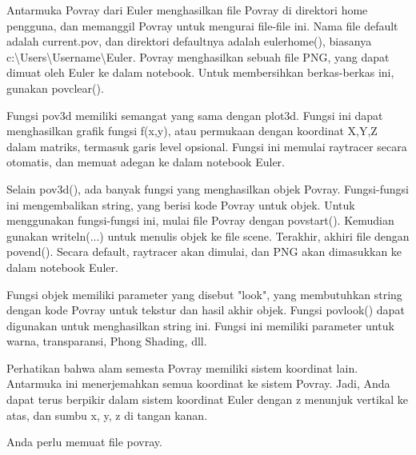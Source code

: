 \documentclass[12pt,arial,letterpaper]{book}
\begin{document}
\begin{eulernootebook}
\begin{eulercomment}
\begin{eulercomment}
\begin{eulernootebook}
\begin{eulercomment}
\begin{eulercomment}
\begin{eulercomment}
\begin{eulercomment}
\begin{eulercomment}
\begin{eulercomment}
\begin{eulercomment}
\begin{eulernotebook}
\begin{eulercomment}
Antarmuka Povray dari Euler menghasilkan file Povray di direktori home
pengguna, dan memanggil Povray untuk mengurai file-file ini. Nama file
default adalah current.pov, dan direktori defaultnya adalah
eulerhome(), biasanya c:\textbackslash{}Users\textbackslash{}Username\textbackslash{}Euler. Povray menghasilkan
sebuah file PNG, yang dapat dimuat oleh Euler ke dalam notebook. Untuk
membersihkan berkas-berkas ini, gunakan povclear().

Fungsi pov3d memiliki semangat yang sama dengan plot3d. Fungsi ini
dapat menghasilkan grafik fungsi f(x,y), atau permukaan dengan
koordinat X,Y,Z dalam matriks, termasuk garis level opsional. Fungsi
ini memulai raytracer secara otomatis, dan memuat adegan ke dalam
notebook Euler.

Selain pov3d(), ada banyak fungsi yang menghasilkan objek Povray.
Fungsi-fungsi ini mengembalikan string, yang berisi kode Povray untuk
objek. Untuk menggunakan fungsi-fungsi ini, mulai file Povray dengan
povstart(). Kemudian gunakan writeln(...) untuk menulis objek ke file
scene. Terakhir, akhiri file dengan povend(). Secara default,
raytracer akan dimulai, dan PNG akan dimasukkan ke dalam notebook
Euler.

Fungsi objek memiliki parameter yang disebut "look", yang membutuhkan
string dengan kode Povray untuk tekstur dan hasil akhir objek. Fungsi
povlook() dapat digunakan untuk menghasilkan string ini. Fungsi ini
memiliki parameter untuk warna, transparansi, Phong Shading, dll.

Perhatikan bahwa alam semesta Povray memiliki sistem koordinat lain.
Antarmuka ini menerjemahkan semua koordinat ke sistem Povray. Jadi,
Anda dapat terus berpikir dalam sistem koordinat Euler dengan z
menunjuk vertikal ke atas, dan sumbu x, y, z di tangan kanan.

Anda perlu memuat file povray.


\end{eulercomment}
\end{eulernotebook}
\end{eulercomment}
\end{eulercomment}
\end{eulercomment}
\end{eulercomment}
\end{eulercomment}
\end{eulercomment}
\end{eulercomment}
\end{eulernootebook}
\end{eulercomment}
\end{eulercomment}
\end{eulernootebook}
\end{document}
